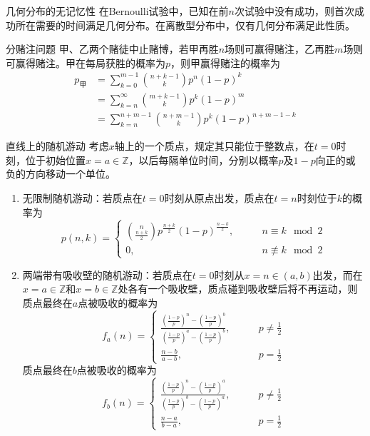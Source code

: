 \documentclass[lang = cn, scheme = chinese, thmcnt = section]{elegantbook}
\newcommand{\Z}{\mathbb{Z}}            %
\begin{document}
\begin{proposition}{几何分布的无记忆性}
	在Bernoulli试验中，已知在前$n$次试验中没有成功，则首次成功所在需要的时间满足几何分布。在离散型分布中，仅有几何分布满足此性质。
\end{proposition}

\begin{theorem}{分赌注问题}
	甲、乙两个赌徒中止赌博，若甲再胜$n$场则可赢得赌注，乙再胜$m$场则可赢得赌注。甲在每局获胜的概率为$p$，则甲赢得赌注的概率为
	\begin{align*}
		p_{\text{甲}}&=\sum_{k=0}^{m-1}{{{n+k-1}\choose{k}}p^n(1-p)^k}\\
		&=\sum_{k=n}^{\infty}{{{m+k-1}\choose{k}}p^k(1-p)^m}\\
		&=\sum_{k=n}^{n+m-1}{{{n+m-1}\choose{k}}p^k(1-p)^{n+m-1-k}}
	\end{align*}
\end{theorem}

\begin{theorem}{直线上的随机游动}
	考虑$x$轴上的一个质点，规定其只能位于整数点，在$t=0$时刻，位于初始位置$x=a\in \Z$，以后每隔单位时间，分别以概率$p$及$1-p$向正的或负的方向移动一个单位。
	\begin{enumerate}
		\item 无限制随机游动：若质点在$t=0$时刻从原点出发，质点在$t=n$时刻位于$k$的概率为
		$$
		p(n,k)=\begin{cases}
			{{n}\choose{\frac{n+k}{2}}}p^{\frac{n+k}{2}}(1-p)^{\frac{n-k}{2}},\qquad & n\equiv k\mod 2\\
			0,\qquad & n\not\equiv k\mod 2
		\end{cases}
		$$
		\item 两端带有吸收壁的随机游动：若质点在$t=0$时刻从$x=n\in(a,b)$出发，而在$x=a\in \Z$和$x=b\in \Z$处各有一个吸收壁，质点碰到吸收壁后将不再运动，则质点最终在$a$点被吸收的概率为
		$$
		f_a(n)=\begin{cases}
			\frac{(\frac{1-p}{p})^n-(\frac{1-p}{p})^b}{(\frac{1-p}{p})^a-(\frac{1-p}{p})^b},&\qquad p\ne\frac{1}{2}\\
			\frac{n-b}{a-b},&\qquad p=\frac{1}{2}
		\end{cases}
		$$
		质点最终在$b$点被吸收的概率为
		$$
		f_b(n)=\begin{cases}
			\frac{(\frac{1-p}{p})^n-(\frac{1-p}{p})^a}{(\frac{1-p}{p})^b-(\frac{1-p}{p})^a},&\qquad p\ne\frac{1}{2}\\
			\frac{n-a}{b-a},&\qquad p=\frac{1}{2}
		\end{cases}
		$$
	\end{enumerate}
\end{theorem}
\end{document}
